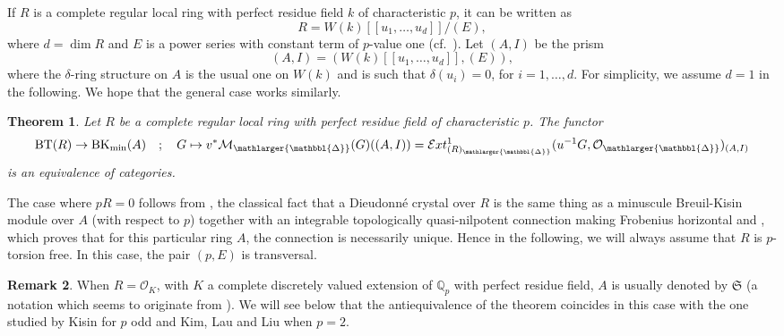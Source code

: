 \documentclass{amsart}
\newcommand{\prism}{{\mathlarger{\mathbbl{\Delta}}}}
\theoremstyle{plain}
\newtheorem{theorem}{Theorem}[subsection]
\theoremstyle{definition}
\newtheorem{remark}[theorem]{Remark}
\newcommand{\Ext}{\mathcal{E}xt}
\newcommand{\BT}{\mathrm{BT}}
\newcommand{\blue}[1]{{\color{black}#1}}
\begin{document}
\blue{If $R$ is a complete regular local ring with perfect residue field $k$ of characteristic $p$, it can be written as}
\[ R = W(k)[[u_1,\dots,u_d]]/(E), \]
where $d=\dim R$ and $E$ is a power series with constant term of $p$-value one (cf.\ \cite[Theorem 29.7, Theorem 29.8 (ii)]{matsumura_commutative_ring_theory}). Let $(A,I)$ be the prism $$(A,I)=(W(k)[[u_1,\dots,u_d]],(E)),$$
where the $\delta$-ring structure on $A$ is the usual one on $W(k)$ and is such that $\delta(u_i)=0$, for $i=1,\dots,d$. \blue{For simplicity, we assume $d=1$ in the following. We hope that the general case works similarly.}


\begin{theorem}
\label{sec:comp-case-mathc-theorem-comparison-with-bk}
 Let $R$ be a complete regular local ring with perfect residue field of characteristic $p$. The functor 
\[ \BT(R) \to \mathrm{BK}_{\mathrm{min}}(A) \quad ; \quad G \mapsto v^* \mathcal{M}_{\prism}(G)((A,I)) = \Ext_{(R)_{\prism}}^1 (u^{-1} G, \mathcal{O}_{\prism})_{(A,I)} \]
is an equivalence of categories.
\end{theorem}

The case where $pR=0$ follows from , the classical fact that a Dieudonn\'e crystal over $R$ is the same thing as a minuscule Breuil-Kisin module over $A$ (with respect to $p$) together with an integrable topologically quasi-nilpotent connection making Frobenius horizontal and \cite[Proposition 2.7.3]{cais_lau_dieudonne_crystals_and_wach_modules_for_p_divisible_groups}, which proves that for this particular ring $A$, the connection is necessarily unique. Hence in the following, we will always assume that $R$ is $p$-torsion free. In this case, the pair $(p,E)$ is transversal. 

\begin{remark}
When $R=\mathcal{O}_K$, with $K$ a complete discretely valued extension of $\mathbb{Q}_p$ with perfect residue field, $A$ is usually denoted by $\mathfrak{S}$ (a notation which seems to originate from \cite{breuil_schemas_en_groupes_et_corps_de_normes}). We will see below that the antiequivalence of the theorem coincides in this case with the one studied by Kisin for $p$ odd and Kim, Lau and Liu when $p=2$.
\end{remark} 
\end{document}
